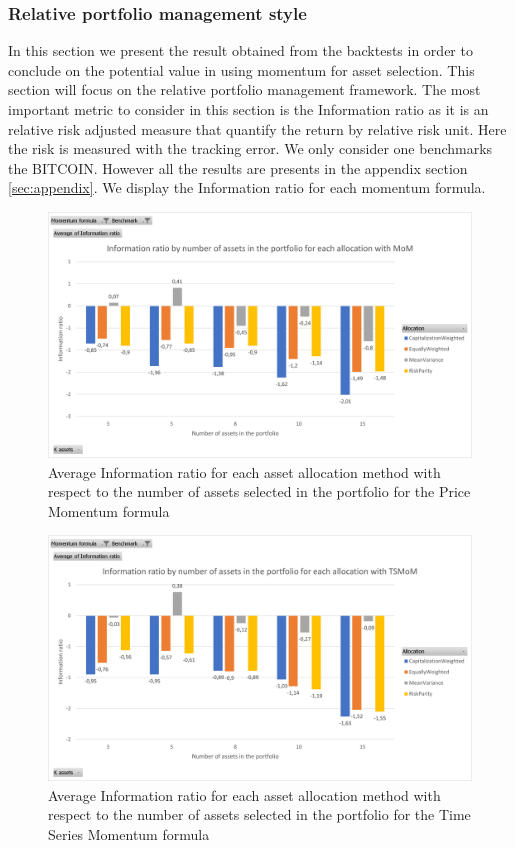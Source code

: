 \documentclass{article}
\begin{document}
\subsubsection{Relative portfolio management style}
In this section we present the result obtained from the backtests in order to conclude on the potential value in using momentum for asset selection. This section will focus on the relative portfolio management framework. The most important metric to consider in this section is the Information ratio as it is an relative risk adjusted measure that quantify the return by relative risk unit. Here the risk is measured with the tracking error. We only consider one benchmarks the BITCOIN. However all the results are presents in the appendix section \ref{sec:appendix}. We display the Information ratio for each momentum formula.

\begin{figure}[H] %
    \centering
    \includegraphics[width=0.75\linewidth]{relative_management/Information ratio MoM_BenchBTC.png}
    \caption{Average Information ratio for each asset allocation method with respect to the number of assets selected in the portfolio for the Price Momentum formula}
    \label{fig:info ratio MoM}
\end{figure}

\begin{figure}[H] %
    \centering
    \includegraphics[width=0.75\linewidth]{relative_management/Information ratio TSMoM_BenchBTC.png}
    \caption{Average Information ratio for each asset allocation method with respect to the number of assets selected in the portfolio for the Time Series Momentum formula}
    \label{fig:info ratio TSMOM}
\end{figure}
\end{document}
